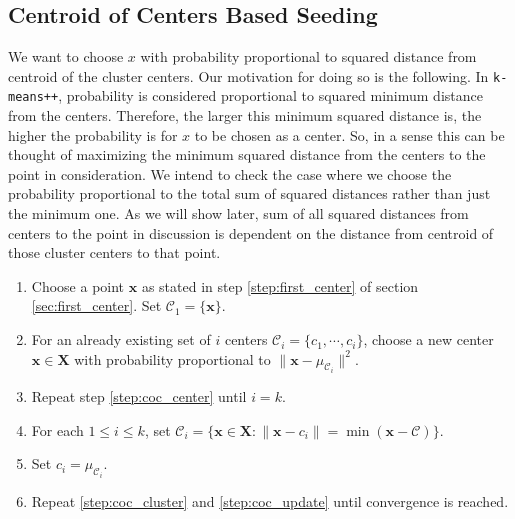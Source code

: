 \documentclass[twoside, 11pt]{article}
\newcommand{\x}{\mathbf{x}}
\newcommand{\X}{\mathbf{X}}
\newcommand{\C}{\mathcal{C}}
\begin{document}
	\subsection{Centroid of Centers Based Seeding}
	We want to choose $x$ with probability proportional to squared distance from centroid of the cluster centers. Our motivation for doing so is the following. In \texttt{k-means++}, probability is considered proportional to squared minimum distance from the centers. Therefore, the larger this minimum squared distance is, the higher the probability is for $x$ to be chosen as a center. So, in a sense this can be thought of maximizing the minimum squared distance from the centers to the point in consideration. We intend to check the case where we choose the probability proportional to the total sum of squared distances rather than just the minimum one. As we will show later, sum of all squared distances from centers to the point in discussion is dependent on the distance from centroid of those cluster centers to that point.
		\begin{enumerate}[i]
			\item Choose a point $\x$ as stated in step \eqref{step:first_center} of section \eqref{sec:first_center}. Set $\C_1=\{\x\}$.
			\item For an already existing set of $i$ centers $\mathcal{C}_i=\{c_1,\cdots,c_i\}$, choose a new center $\x\in\X$ with probability proportional to $\|\x-\mu_{\C_i}\|^2$.\label{step:coc_center}
			\item Repeat step \eqref{step:coc_center} until $i=k$.
			\item For each $1\leq i\leq k$, set $\C_i=\{\x\in\X:\|\x-c_i\|=\min(\x-\C)\}$.\label{step:coc_cluster}
			\item Set $c_i=\mu_{\C_i}$.\label{step:coc_update}
			\item Repeat \eqref{step:coc_cluster} and \eqref{step:coc_update} until convergence is reached.
		\end{enumerate}
\end{document}
